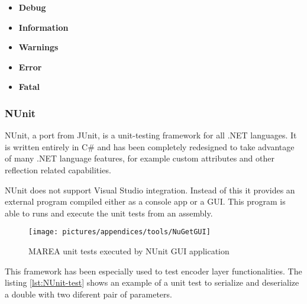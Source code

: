 \begin{itemize}
\item \textbf{Debug}   
\item \textbf{Information} 
\item \textbf{Warnings}
\item \textbf{Error} 
\item \textbf{Fatal} 
\end{itemize}

\subsubsection{NUnit}\label{SSS:Tools-Nunit}

NUnit, a port from JUnit, is a unit-testing framework for all .NET languages. It is written entirely in C\# and has been completely redesigned to take advantage of many .NET language features, for example custom attributes and other reflection related capabilities. 

NUnit does not support Visual Studio integration. Instead of this it provides an external program compiled either as a console app or a GUI. This program is able to runs and execute the unit tests from an assembly.

\begin{figure}[H]\begin{center}
 \centering
  \captionsetup{justification=centering}
  \texttt{[image: pictures/appendices/tools/NuGetGUI]}
  \caption{MAREA unit tests executed by NUnit GUI application\label{fig:tools-NUnitGUI}}
\end{center}\end{figure}

This framework has been especially used to test encoder layer functionalities. The listing \ref{lst:NUnit-test} shows an example of a unit test to serialize and deserialize a double with two diferent pair of parameters.

